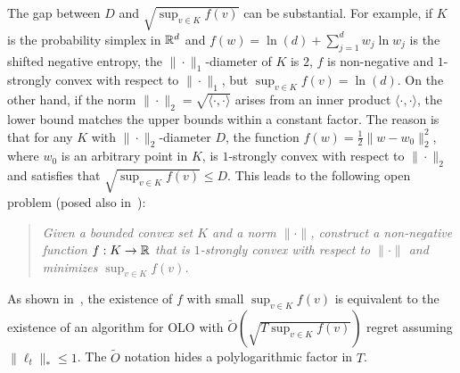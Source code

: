 The gap between $D$ and $\sqrt{\sup_{v \in K} f(v)}$ can be substantial.  For
example, if $K$ is the probability simplex in $\mathbb{R}^d$ and $f(w) = \ln(d) +
\sum_{j=1}^d w_j \ln w_j$ is the shifted negative entropy, the
$\|\cdot\|_1$-diameter of $K$ is $2$, $f$ is non-negative and $1$-strongly
convex with respect to $\|\cdot\|_1$, but $\sup_{v \in K} f(v) = \ln(d)$.  On
the other hand, if the norm $\|\cdot\|_2 = \sqrt{\langle \cdot, \cdot \rangle}$
arises from an inner product $\langle \cdot, \cdot \rangle$, the lower bound
matches the upper bounds within a constant factor.  The reason is that for any
$K$ with $\|\cdot\|_2$-diameter $D$, the function $f(w) = \frac{1}{2} \|w -
w_0\|_2^2$, where $w_0$ is an arbitrary point in $K$, is $1$-strongly convex
with respect to $\|\cdot\|_2$ and satisfies that $\sqrt{\sup_{v \in K} f(v)}
\le D$. This leads to the following open problem (posed also
in~\cite{Kwon-Mertikopoulos-2014}):
%
\begin{quotation}
\noindent
\emph{Given a bounded convex set $K$ and a norm $\|\cdot\|$, construct a
non-negative function $f:K \to \mathbb{R}$ that is $1$-strongly convex with respect to
$\|\cdot\|$ and minimizes $\sup_{v \in K} f(v)$.}
\end{quotation}
%
As shown in~\cite{Srebro-Sridharan-Tewari-2011}, the existence of $f$ with
small $\sup_{v \in K} f(v)$ is equivalent to the existence of an algorithm for
OLO with $\widetilde O(\sqrt{T \sup_{v \in K} f(v)})$ regret assuming
$\|\ell_t\|_* \le 1$.  The $\widetilde O$ notation hides a polylogarithmic
factor in $T$.
